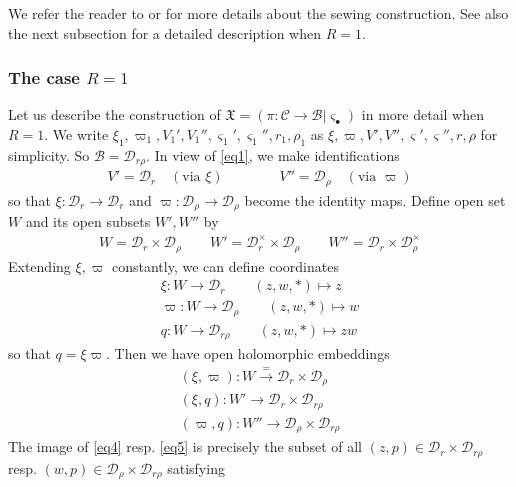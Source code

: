 \documentclass[11pt,b5paper,notitlepage]{article}
\theoremstyle{definition}
\theoremstyle{plain}
\newcommand{\sgm}{\varsigma}
\newcommand{\blt}{\bullet}
\newcommand{\<}{\left\langle}
\renewcommand{\>}{\right\rangle}
\newcommand{\MC}{\mathcal{C}}
\newcommand{\MB}{\mathcal{B}}
\newcommand{\fx}{\mathfrak{X}}
\newcommand{\MD}{\mathcal{D}}
\numberwithin{equation}{section}
\begin{document}
We refer the reader to \cite[Sec. 2.3]{GZ1} or \cite[Sec. 1.2]{GZ2} for more details about the sewing construction. See also the next subsection for a detailed description when $R=1$.



\subsubsection{The case $R=1$}\label{lb3}

Let us describe the construction of $\fx=(\pi:\MC\rightarrow\MB|\sgm_\blt)$ in more detail when $R=1$. We write $\xi_1,\varpi_1,V_1',V_1'',\sgm_1',\sgm_1'',r_1,\rho_1$ as $\xi,\varpi,V',V'',\sgm',\sgm'',r,\rho$ for simplicity. So $\MB=\MD_{r\rho}$. In view of \eqref{eq1}, we make identifications
\begin{gather}\label{eq6}
V'=\MD_r\quad(\text{via }\xi)\qquad\qquad V''=\MD_\rho\quad (\text{via }\varpi)
\end{gather}
so that $\xi:\MD_r\rightarrow\MD_r$ and $\varpi:\MD_\rho\rightarrow\MD_\rho$ become the identity maps. Define open set $W$ and its open subsets $W',W''$ by
\begin{gather}
W=\MD_r\times\MD_\rho\qquad W'=\MD_r^\times\times\MD_\rho\qquad W''=\MD_r\times\MD_\rho^\times
\end{gather}
Extending $\xi,\varpi$ constantly, we can define coordinates
\begin{subequations}\label{eq2}
\begin{gather}
    \xi:W\rightarrow \MD_r  \qquad (z,w,*)\mapsto z\\
    \varpi:W\rightarrow \MD_\rho\qquad (z,w,*)\mapsto w\\
q:W\rightarrow \MD_{r\rho} \qquad (z,w,*)\mapsto zw
\end{gather}
\end{subequations}
so that $q=\xi\varpi$. Then we have open holomorphic embeddings
\begin{subequations}\label{eq11}
\begin{gather}
(\xi,\varpi):W\xrightarrow{=} \MD_r\times \MD_\rho  \label{eq3}\\
(\xi,q):W'\rightarrow \MD_r\times \MD_{r\rho} \label{eq4}\\
(\varpi,q):W''\rightarrow \MD_\rho\times \MD_{r\rho} \label{eq5}
\end{gather}
\end{subequations}
The image of \eqref{eq4} resp. \eqref{eq5} is precisely the subset of all $(z,p)\in \MD_r\times \MD_{r\rho}$ resp. $(w,p)\in \MD_\rho\times \MD_{r\rho}$ satisfying 
\end{document}
